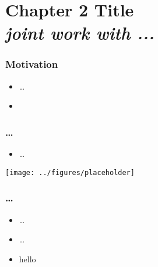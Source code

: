 
\section{Chapter 2 Title\\ \textit{\textmd{joint work with ...}}}
\label{chapter2}

\begin{frame}[t]\frametitle{Motivation}
    \begin{itemize}[<+->]
        \item \ldots
        \item \cite{Abbring2007}
    \end{itemize}
    \vfill
    \hyperlink{backup_2}{}
\end{frame}

\begin{frame}\frametitle{\ldots}
    \begin{itemize}
        \item \ldots
    \end{itemize}
    \begin{center}
        \texttt{[image: ../figures/placeholder]}
    \end{center}
\end{frame}

\begin{frame}[t]
    \frametitle{\ldots}
    \begin{itemize}
        \item<1-> \ldots
        \item<2->[$\Rightarrow$] \ldots \vspace{1em}
        \item<3-> hello 
    \end{itemize}
\end{frame}
